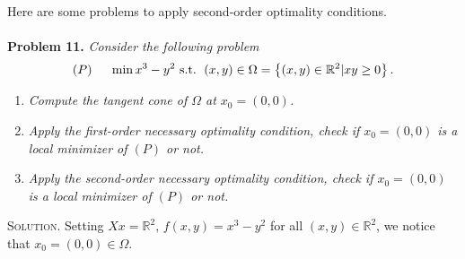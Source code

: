 \documentclass[a4paper]{article}
\numberwithin{equation}{section}
\begin{document}
Here are some problems to apply second-order optimality conditions.\\
\\
\textbf{Problem 11.} \textit{Consider the following problem}
\begin{align}
\left( P \right)\hspace{0.5cm}\min {x^3} - {y^2}\mbox{ s.t. }\left( {x,y} \right) \in \Omega  = \left\{ {\left( {x,y} \right) \in {\mathbb{R}^2}|xy \ge 0} \right\}.
\end{align}
\begin{enumerate}
\item \textit{Compute the tangent cone of $\Omega$ at $x_0=\left(0,0\right)$.}
\item \textit{Apply the first-order necessary optimality condition, check if $x_0=\left(0,0\right)$ is a local minimizer of $\left(P\right)$ or not.}
\item \textit{Apply the second-order necessary optimality condition, check if $x_0=\left(0,0\right)$ is a local minimizer of $\left(P\right)$ or not.}
\end{enumerate}
\textsc{Solution.} Setting $Xx=\mathbb{R}^2$, $f\left(x,y\right)=x^3-y^2$ for all $\left(x,y\right)\in \mathbb{R}^2$, we notice that $x_0=\left(0,0\right)\in \Omega$.
\end{document}

